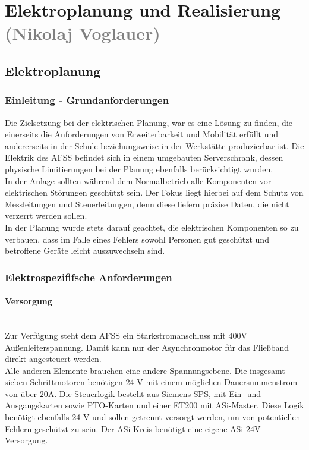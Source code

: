 \section{Elektroplanung und Realisierung \textcolor{gray}{(Nikolaj Voglauer)}}

\subsection{Elektroplanung}
\label{sec:Elektroplanung}

\subsubsection{Einleitung - Grundanforderungen}
    Die Zielsetzung bei der elektrischen Planung, war es eine Lösung zu finden, die einerseits die Anforderungen von Erweiterbarkeit und Mobilität erfüllt und andererseits in der Schule beziehungsweise in der Werkstätte produzierbar ist. Die Elektrik des AFSS befindet sich in einem umgebauten Serverschrank, dessen physische Limitierungen bei der Planung ebenfalls berücksichtigt wurden.\\
    In der Anlage sollten während dem Normalbetrieb alle Komponenten vor elektrischen Störungen geschützt sein. Der Fokus liegt hierbei auf dem Schutz von Messleitungen und Steuerleitungen, denn diese liefern präzise Daten, die nicht verzerrt werden sollen.\\ 
    In der Planung wurde stets darauf geachtet, die elektrischen Komponenten so zu verbauen, dass im Falle eines Fehlers sowohl Personen gut geschützt und betroffene Geräte leicht auszuwechseln sind.\\

\subsubsection{Elektrospezififsche Anforderungen}
\label{sec:Elektrik spezififsche Anforderungen}

    \paragraph{Versorgung}\mbox{}\\
    Zur Verfügung steht dem AFSS ein Starkstromanschluss mit 400V Außenleiterspannung. Damit kann nur der Asynchronmotor für das Fließband direkt angesteuert werden.\\
    Alle anderen Elemente brauchen eine andere Spannungsebene. Die insgesamt sieben Schrittmotoren benötigen 24 V mit einem möglichen Dauersummenstrom von über 20A. Die Steuerlogik besteht aus Siemens-SPS, mit Ein- und Ausgangskarten sowie PTO-Karten und einer ET200 mit ASi-Master. Diese Logik benötigt ebenfalls 24 V und sollen getrennt versorgt werden, um von potentiellen Fehlern geschützt zu sein. Der ASi-Kreis benötigt eine eigene ASi-24V-Versorgung.


